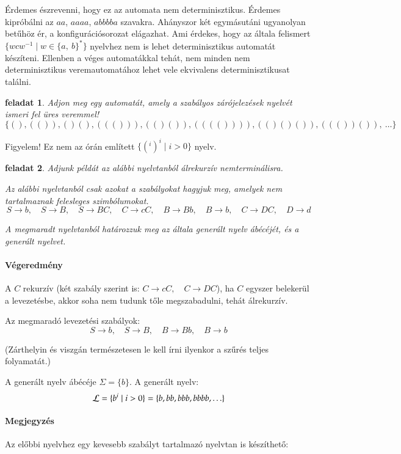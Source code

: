 \documentclass[a4paper]{article}
\newtheorem{feladat}{feladat}[section]
\begin{document}
Érdemes észrevenni, hogy ez az automata nem determinisztikus. Érdemes
kipróbálni az $aa$, $aaaa$, $abbbba$ szavakra. Ahányszor két egymásutáni
ugyanolyan betűhöz ér, a konfigurációsorozat elágazhat. Ami
érdekes, hogy az általa felismert $\{wcw^{-1} \mid w\in \{a,\:b\}^*\}$
nyelvhez nem is lehet determinisztikus automatát készíteni. Ellenben a
véges automatákkal tehát, nem minden nem determinisztikus
veremautomatához lehet vele ekvivalens determinisztikusat találni.

\begin{feladat}{}
  Adjon meg egy automatát, amely a szabályos zárójelezések nyelvét
  ismeri fel üres veremmel!
  \[\{ (), (()), ()(), ((())), (()()), (((()))), (()()()), ((())()),\: \dots \}\]
\end{feladat}

Figyelem! Ez nem az órán említett $\{(^i)^i \mid i>0\}$ nyelv.

\begin{feladat}
Adjunk példát az alábbi nyelvtanból álrekurzív nemterminálisra.

Az alábbi nyelvtanból csak azokat a szabályokat hagyjuk meg, amelyek nem
tartalmaznak felesleges szimbólumokat.
\[ S\to b,\quad  S\to B,\quad  S\to BC,\quad  C\to cC,\quad  B\to Bb,\quad  B\to b,\quad  C\to DC,\quad  D\to d\]

A megmaradt nyelvtanból határozzuk meg az általa generált nyelv ábécéjét, és a generált nyelvet.
\end{feladat}

\paragraph{Végeredmény}
A $C$ rekurzív (két szabály szerint is: $C\to cC,\quad  C\to DC$), ha
$C$ egyszer belekerül a levezetésbe, akkor soha nem tudunk tőle
megszabadulni, tehát álrekurzív.

Az megmaradó levezetési szabályok:
\[ S\to b,\quad  S\to B,\quad  B\to Bb,\quad  B\to b\]

(Zárthelyin és viszgán természetesen le kell írni ilyenkor a szűrés
teljes folyamatát.)

A generált nyelv ábécéje $\Sigma=\{b\}$. A generált nyelv:
\[{\cal L} = \{b^i \mid i>0\}=\{b, bb, bbb, bbbb, \ldots\}\]

\paragraph{Megjegyzés}
Az előbbi nyelvhez egy kevesebb szabályt tartalmazó nyelvtan is
készíthető:
\end{document}
